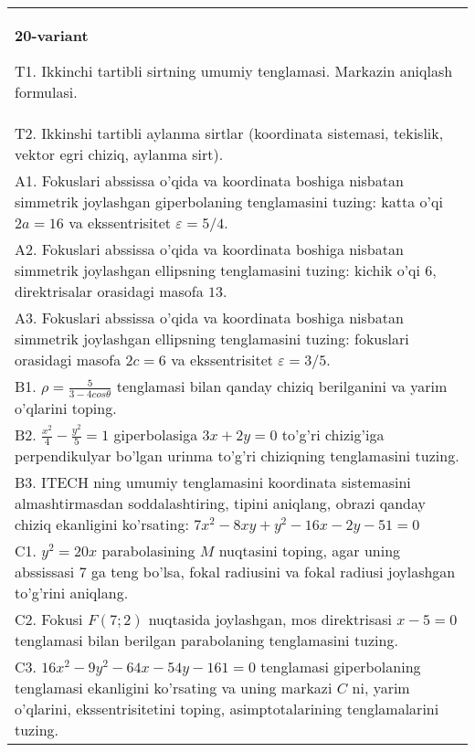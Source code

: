 \documentclass{article}
\begin{document}
\begin{tabular}{m{17cm}}
\textbf{20-variant}
\newline

T1. Ikkinchi tartibli sirtning umumiy tenglamasi. Markazin aniqlash formulasi.\\

T2. Ikkinshi tartibli aylanma sirtlar (koordinata sistemasi, tekislik, vektor egri chiziq, aylanma sirt).\\

A1. Fokuslari abssissa o'qida va koordinata boshiga nisbatan simmetrik joylashgan giperbolaning tenglamasini tuzing: katta o'qi $2a=16$ va ekssentrisitet $\varepsilon=5/4$.\\

A2. Fokuslari abssissa o'qida va koordinata boshiga nisbatan simmetrik joylashgan ellipsning tenglamasini tuzing: kichik o'qi $6$, direktrisalar orasidagi masofa $13$.\\

A3. Fokuslari abssissa o'qida va koordinata boshiga nisbatan simmetrik joylashgan ellipsning tenglamasini tuzing: fokuslari orasidagi masofa $2c=6$ va ekssentrisitet $\varepsilon=3/5$.\\

B1. $\rho = \frac{5}{3 - 4cos\theta}$ tenglamasi bilan qanday chiziq berilganini va yarim o'qlarini toping.  \\

B2. $\frac{x^{2}}{4} - \frac{y^{2}}{5} = 1$ giperbolasiga $3x + 2y = 0$ to'g'ri chizig'iga perpendikulyar bo'lgan urinma to'g'ri chiziqning tenglamasini tuzing.\\

B3. ITECH ning umumiy tenglamasini koordinata sistemasini almashtirmasdan soddalashtiring, tipini aniqlang, obrazi qanday chiziq ekanligini ko'rsating: $7x^{2} - 8xy + y^{2} - 16x - 2y - 51 = 0$\\

C1. $y^{2} = 20x$ parabolasining $M$ nuqtasini toping, agar uning abssissasi 7 ga teng bo'lsa, fokal radiusini va fokal radiusi joylashgan to'g'rini aniqlang.\\

C2. Fokusi $F(7;2)$ nuqtasida joylashgan, mos direktrisasi $x - 5 = 0$ tenglamasi bilan berilgan parabolaning tenglamasini tuzing.  \\

C3. $16x^{2} - 9y^{2} - 64x - 54y - 161 = 0$ tenglamasi giperbolaning tenglamasi ekanligini ko'rsating va uning markazi $C$ ni, yarim o'qlarini, ekssentrisitetini toping, asimptotalarining tenglamalarini tuzing.  \\

\end{tabular}
\vspace{1cm}
\end{document}
